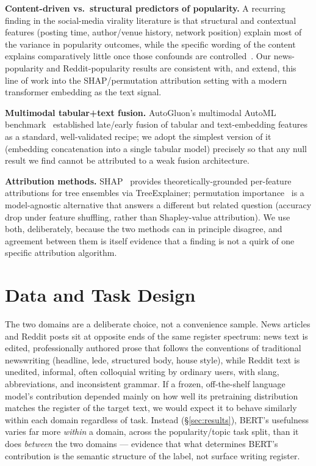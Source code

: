 \documentclass[conference]{IEEEtran}
\begin{document}
\textbf{Content-driven vs.\ structural predictors of popularity.} A recurring finding in the social-media virality literature is that structural and contextual features (posting time, author/venue history, network position) explain most of the variance in popularity outcomes, while the specific wording of the content explains comparatively little once those confounds are controlled~\cite{tan2014effect,lakkaraju2013s,gilbert2010widespread}. Our news-popularity and Reddit-popularity results are consistent with, and extend, this line of work into the SHAP/permutation attribution setting with a modern transformer embedding as the text signal.

\textbf{Multimodal tabular+text fusion.} AutoGluon's multimodal AutoML benchmark~\cite{shi2021multimodal} established late/early fusion of tabular and text-embedding features as a standard, well-validated recipe; we adopt the simplest version of it (embedding concatenation into a single tabular model) precisely so that any null result we find cannot be attributed to a weak fusion architecture.

\textbf{Attribution methods.} SHAP~\cite{lundberg2017unified} provides theoretically-grounded per-feature attributions for tree ensembles via TreeExplainer; permutation importance~\cite{breiman2001random,fisher2019models} is a model-agnostic alternative that answers a different but related question (accuracy drop under feature shuffling, rather than Shapley-value attribution). We use both, deliberately, because the two methods can in principle disagree, and agreement between them is itself evidence that a finding is not a quirk of one specific attribution algorithm.

\section{Data and Task Design}
\label{sec:data}

The two domains are a deliberate choice, not a convenience sample. News articles and Reddit posts sit at opposite ends of the same register spectrum: news text is edited, professionally authored prose that follows the conventions of traditional newswriting (headline, lede, structured body, house style), while Reddit text is unedited, informal, often colloquial writing by ordinary users, with slang, abbreviations, and inconsistent grammar. If a frozen, off-the-shelf language model's contribution depended mainly on how well its pretraining distribution matches the register of the target text, we would expect it to behave similarly within each domain regardless of task. Instead (\S\ref{sec:results}), BERT's usefulness varies far more \emph{within} a domain, across the popularity/topic task split, than it does \emph{between} the two domains --- evidence that what determines BERT's contribution is the semantic structure of the label, not surface writing register.
\end{document}

